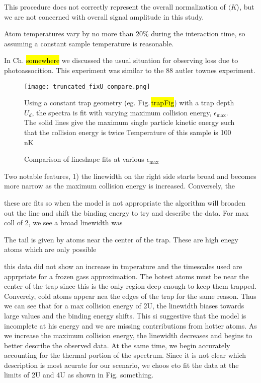 This procedure does not correctly represent the overall normalization of $\langle K \rangle$, but we are not concerned with overall signal amplitude in this study.

Atom temperatures vary by no more than 20\% during the interaction time, so assuming a constant sample temperature is reasonable.




In Ch. \hl{somewhere} we discussed the usual situation for observing loss due to photoassocition. 
This experiment was similar to the 88 autler townes experiment. 

	\begin{figure} 
	\centerline{
	  \texttt{[image: truncated\_fixU\_compare.png]}}
	  \caption{Comparison of lineshape fits at various $\epsilon_{\text{max}}$}{Using a constant trap geometry (eg. Fig.\,\hl{trapFig}) with a trap depth $U_d$, the spectra is fit with varying maximum collision energy, $\epsilon_{\text{max}}$. The solid lines give the maximum single particle kinetic energy such that the collision energy is twice  Temperature of this sample is 100\,nK}
	  \label{fig:truncatedSpectraFit}
	\end{figure}
Two notable features, 1) the linewidth on the right side starts broad and becomes more narrow as the maximum collision energy is increased.
Conversely, the 

these are fits so when the model is not appropriate the algorithm will broaden out the line and shift the binding energy to try and describe the data.
For max coll of 2, we see a broad linewidth was 

The tail is given by atoms near the center of the trap. These are high enegy atoms which are only possible 

this data did not show an increase in tmperature and the timescales used are apprpriate for a frozen gass approximation.
The hotest atoms must be near the center of the trap since this is the only region deep enough to keep them trapped.
Converely, cold atoms appear nea the edges of the trap for the same reason.
Thus we can see that for a max collision energy of 2U, the linewidth biases towards large values and the binding energy shifts. This si suggestive that the model is incomplete at his energy and we are missing contrributions from hotter atoms.
As we increase the maximum collision energy, the linewidth decreases and begins to better describe the observed data. At the same time, we begin accurately accounting for the thermal portion of the spectrum.
Since it is not clear which description is most acurate for our scenario, we choos eto fit the data at the limits of 2U and 4U as shown in Fig. something.







